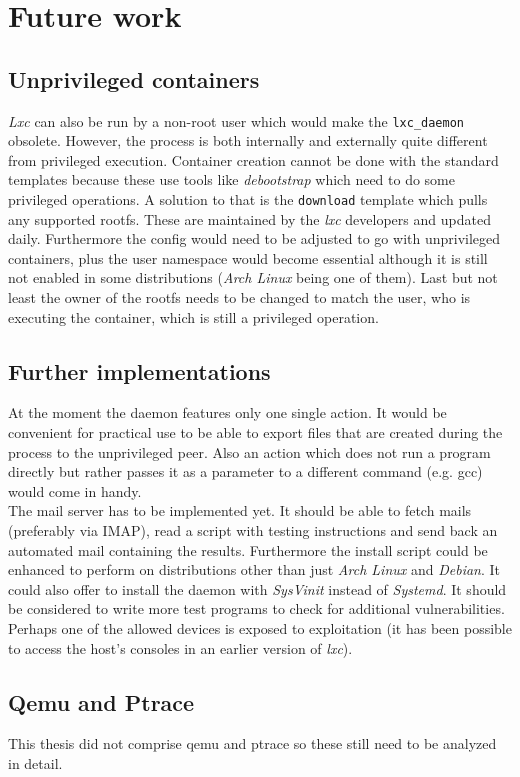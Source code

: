 \chapter{Future work}

\section{Unprivileged containers}

\textit{Lxc} can also be run by a non-root user which would make the \texttt{lxc\_daemon} obsolete.
However, the process is both internally and externally quite different from privileged execution.
Container creation cannot be done with the standard templates because these use tools like
\textit{debootstrap} which need to do some privileged operations. A solution to that is the \texttt{download} template
which pulls any supported rootfs. These are maintained by the \textit{lxc} developers and updated daily.
Furthermore the config would need to
be adjusted to go with unprivileged containers, plus the user namespace would become essential
although it is still not enabled in some distributions (\textit{Arch Linux} being one of them).
Last but not least the owner of the rootfs needs to be changed to match the user, who is executing
the container, which is still a privileged operation.

\section{Further implementations}

At the moment the daemon features only one single action. It would be convenient for practical use
to be able to export files that are created during the process to the unprivileged peer.
Also an action which does not run a program directly but rather passes it as a parameter to a different
command (e.g. gcc) would come in handy.\\
The mail server has to be implemented yet. It should be able to fetch mails (preferably via IMAP),
read a script with testing instructions and send back an automated mail containing the results.
Furthermore the install script could be enhanced to perform on distributions other than just
\textit{Arch Linux} and \textit{Debian}. It could also offer to install the daemon with \textit{SysVinit}\cite{sysvinit}
instead of \textit{Systemd}\cite{systemd}.
It should be considered to write more test programs to check for additional vulnerabilities.
Perhaps one of the allowed devices is exposed to exploitation (it has been possible to access the
host's consoles in an earlier version of \textit{lxc}).

\section{Qemu and Ptrace}

This thesis did not comprise qemu and ptrace so these still need to be analyzed in detail.